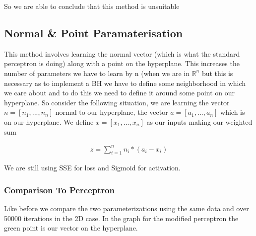 \documentclass{article}
\theoremstyle{definition}
\begin{document}
So we are able to conclude that this method is unsuitable

\subsection{Normal \& Point Paramaterisation}
This method involves learning the normal vector (which is what the standard perceptron is doing) along with a point on the hyperplane. This increases the number of parameters we have to learn by n (when we are in $\mathbb{R}^n$ but this is necessary as to implement a BH we have to define some neighborhood in which we care about and to do this we need to define it around some point on our hyperplane. So consider the following situation, we are learning the vector $n = [n_1, ..., n_n]$ normal to our hyperplane, the vector $a = [a_1, ..., a_n]$ which is on our hyperplane. We define $x = [x_1, ..., x_n]$ as our inputs making our weighted sum

\begin{align*}
z = \sum_{i=1}^n n_i * (a_i - x_i)
\end{align*}

We are still using SSE for loss and Sigmoid for activation.

\subsubsection{Comparison To Perceptron}
Like before we compare the two parameterizations using the same data and over 50000 iterations in the 2D case. In the graph for the modified perceptron the green point is our vector on the hyperplane.
\end{document}
